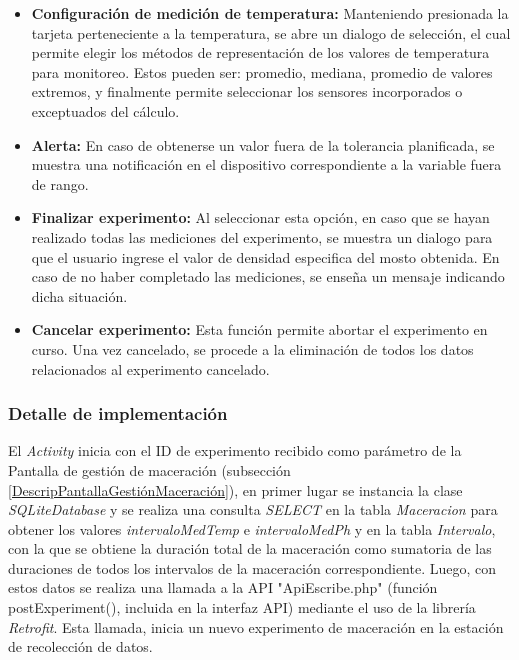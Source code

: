                 \begin{itemize}
                    \item \textbf {Configuración de medición de temperatura:} Manteniendo presionada la tarjeta perteneciente a la temperatura, se abre un dialogo de selección, el cual permite elegir los métodos de representación de los valores de temperatura para monitoreo. Estos pueden ser: promedio, mediana, promedio de valores extremos, y finalmente permite seleccionar los sensores incorporados o exceptuados del cálculo.
                    
                    \item \textbf{Alerta:} En caso de obtenerse un valor fuera de la tolerancia planificada, se muestra una notificación en el dispositivo correspondiente a la variable fuera de rango. 
                    
                    \item \textbf{Finalizar experimento:} Al seleccionar esta opción, en caso que se hayan realizado todas las mediciones del experimento, se muestra un dialogo para que el usuario ingrese el valor de densidad especifica del mosto obtenida. En caso de no haber completado las mediciones, se enseña un mensaje indicando dicha situación.
            
                    \item \textbf{Cancelar experimento:} Esta función permite abortar el experimento en curso. Una vez cancelado, se procede a la eliminación de todos los datos relacionados al experimento cancelado.
                \end{itemize}
            
            \subsubsection{Detalle de implementación}
             \par El \textit{Activity} inicia con el ID de experimento recibido como parámetro de la Pantalla de gestión de maceración (subsección \ref{DescripPantallaGestiónMaceración}), en primer lugar se instancia la clase \textit{SQLiteDatabase} y se realiza una consulta \textit{SELECT} en la tabla \textit{Maceracion} para obtener los valores \textit{intervaloMedTemp} e \textit{intervaloMedPh} y en la tabla \textit{Intervalo}, con la que se obtiene la duración total de la maceración como sumatoria de las duraciones de todos los intervalos de la maceración correspondiente. Luego, con estos datos se realiza una llamada a la API "ApiEscribe.php" (función postExperiment(), incluida en la interfaz API) mediante el uso de la librería \textit{Retrofit}. Esta llamada, inicia un nuevo experimento de maceración en la estación de recolección de datos.
             
